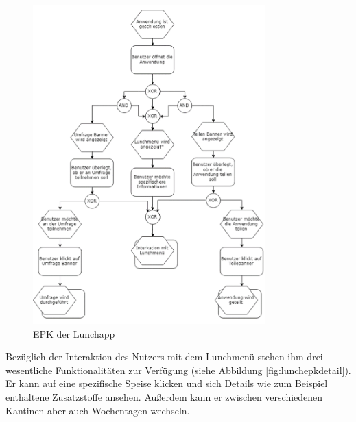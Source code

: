 \begin{figure}[H]
\centering
\includegraphics[width=0.8\textwidth]{images/lunchapp_epk}
\caption[EPK der Lunchapp]{EPK der Lunchapp}
\label{fig:lunchepk}
\end{figure}

Bezüglich der Interaktion des Nutzers mit dem Lunchmenü stehen ihm drei wesentliche Funktionalitäten zur Verfügung (siehe Abbildung \ref{fig:lunchepkdetail}). Er kann auf eine spezifische Speise klicken und sich Details wie zum Beispiel enthaltene Zusatzstoffe ansehen. Außerdem kann er zwischen verschiedenen Kantinen aber auch Wochentagen wechseln.

